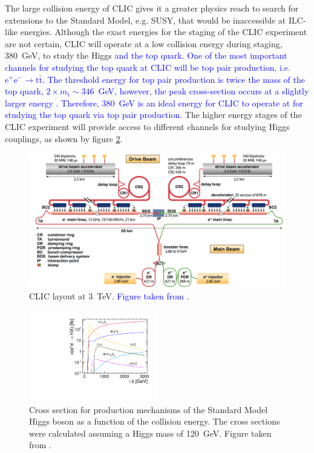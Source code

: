 The large collision energy of CLIC gives it a greater physics reach to search for extensions to the Standard Model, e.g. SUSY, that would be inaccessible at ILC-like energies.  Although the exact energies for the staging of the CLIC experiment are not certain, CLIC will operate at a low collision energy during staging, 380~GeV, to study the Higgs \textcolor{blue}{and the top quark.  One of the most important channels for studying the top quark at CLIC will be top pair production, i.e. $\text{e}^{+}\text{e}^{-} \rightarrow \text{t}\bar{\text{t}}$.  The threshold energy for top pair production is twice the mass of the top quark, $2 \times m_{\text{t}} \sim 346$~GeV, however, the peak cross-section occurs at a slightly larger energy \cite{Linssen:2012hp}.  Therefore, 380~GeV is an ideal energy for CLIC to operate at for studying the top quark via top pair production.}  The higher energy stages of the CLIC experiment will provide access to different channels for studying Higgs couplings, as shown by figure \ref{fig:higssprodclic}.

\begin{figure}[h!]
\includegraphics[width=1.0\textwidth]{Introduction/Plots/CLIC.png}
\caption[CLIC layout at 3~TeV.  \textcolor{blue}{Figure taken from} \cite{CLIC:2016zwp}.]{CLIC layout at 3~TeV.  \textcolor{blue}{Figure taken from} \cite{CLIC:2016zwp}.}
\label{fig:clic}
\end{figure}

\begin{figure}[h!]
\includegraphics[width=0.5\textwidth]{Introduction/Plots/CDRPlots/HiggsCrossSectionCLIC.pdf}
\caption[Cross section for production mechanisms of the Standard Model Higgs boson as a function of the collision energy.  The cross sections were calculated assuming a Higgs mass of 120~GeV.  Figure taken from \cite{Linssen:2012hp}.]{Cross section for production mechanisms of the Standard Model Higgs boson as a function of the collision energy.  The cross sections were calculated assuming a Higgs mass of 120~GeV.  Figure taken from \cite{Linssen:2012hp}.}
\label{fig:higssprodclic}
\end{figure}


